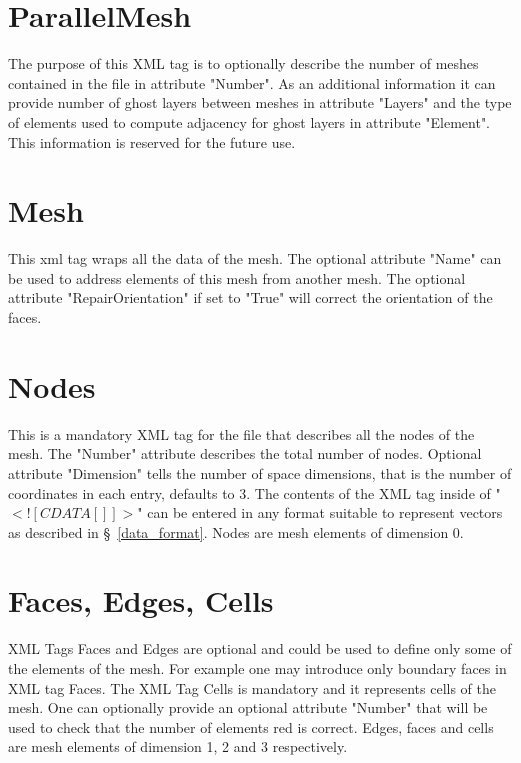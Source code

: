 \documentclass[14pt]{article}
\begin{document}
\section{ParallelMesh}
The purpose of this XML tag is to optionally describe the number of meshes contained in the file in attribute "Number". As an additional information it can provide number of ghost layers between meshes in attribute "Layers" and the type of elements used to compute adjacency for ghost layers in attribute "Element". This information is reserved for the future use.
\section{Mesh}
This xml tag wraps all the data of the mesh. The optional attribute "Name" can be used to address elements of this mesh from another mesh. The optional attribute "RepairOrientation" if set to "True" will correct the orientation of the faces.

\section{Nodes}
This is a mandatory XML tag for the file that describes all the nodes of the mesh. The "Number" attribute describes the total number of nodes. Optional attribute "Dimension" tells the number of space dimensions, that is the number of coordinates in each entry, defaults to 3. The contents of the XML tag inside of "$<![CDATA[]]>$" can be entered in any format suitable to represent vectors as described in \S~\ref{data_format}. Nodes are mesh elements of dimension 0.
\section{Faces, Edges, Cells}
XML Tags Faces and Edges are optional and could be used to define only some of the elements of the mesh. For example one may introduce only boundary faces in XML tag Faces. The XML Tag Cells is mandatory and it represents cells of the mesh. One can optionally provide an optional attribute "Number" that will be used to check that the number of elements red is correct. Edges, faces and cells are mesh elements of dimension 1, 2 and 3 respectively.
\end{document}
